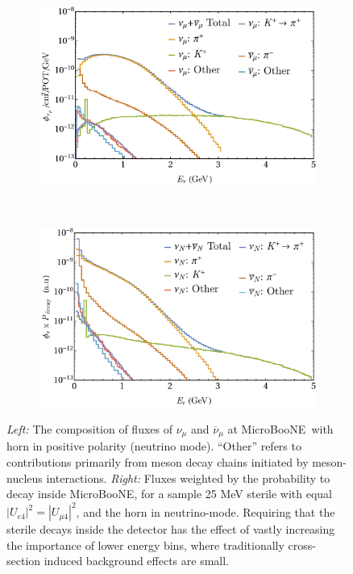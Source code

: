 \documentclass[11pt, a4paper]{article}
\def\muboone{MicroBooNE}
\begin{document}
\begin{figure}[t]
\center
\begin{subfigure}[t]{0.5\textwidth}
\includegraphics[width=\textwidth]{figures/microBooNE_flux.pdf} 
\end{subfigure}%
~
\begin{subfigure}[t]{0.5\textwidth}
\includegraphics[width=\textwidth]{figures/microBooNE_flux_weighted.pdf}
\end{subfigure}

\caption{\label{fig:flux_plots} \emph{Left:} The composition of fluxes of $\nu_\mu$
and $\overline{\nu}_\mu$ at \muboone\ with horn in positive polarity (neutrino
mode). ``Other'' refers to contributions primarily from meson decay chains
initiated by meson-nucleus interactions.\emph{ Right:} Fluxes weighted by the
probability to decay inside \muboone, for a sample 25 MeV sterile with equal
$|U_{e4}|^2 = |U_{\mu 4}|^2$, and the horn in neutrino-mode. Requiring that the
sterile decays inside the detector has the effect of vastly increasing the importance of lower
energy bins, where traditionally cross-section induced background effects are
small.}

\end{figure}
\end{document}
